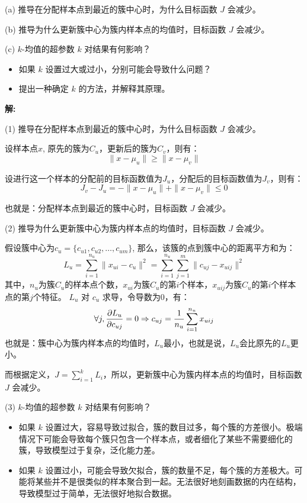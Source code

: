 \documentclass[8pt]{article}
\begin{document}
(a) 推导在分配样本点到最近的簇中心时，为什么目标函数 \( J \) 会减少。 

(b) 推导为什么更新簇中心为簇内样本点的均值时，目标函数 \( J \) 会减少。 

(c) \( k \)-均值的超参数 \( k \) 对结果有何影响？  
\begin{itemize}
    \item  如果 \( k \) 设置过大或过小，分别可能会导致什么问题？  
    \item 提出一种确定 \( k \) 的方法，并解释其原理。  
\end{itemize}

\textbf{\large 解:}

(1) 推导在分配样本点到最近的簇中心时，为什么目标函数 \( J \) 会减少。

设样本点$x$, 原先的簇为$C_u$，更新后的簇为$C_v$，则有：
\[\|x-\mu_u\| \ge \|x-\mu_v\|\]

设进行这一个样本的分配前的目标函数值为$J_u$，分配后的目标函数值为$J_v$，则有：
\[J_v - J_u = - \|x-\mu_u\| + \|x-\mu_v\| \le 0 \]

也就是：分配样本点到最近的簇中心时，目标函数 \( J \) 会减少。

(2) 推导为什么更新簇中心为簇内样本点的均值时，目标函数 \( J \) 会减少。

假设簇中心为$c_u = \{c_{u1}, c_{u2}, \dots , c_{um}\}$, 那么，该簇的点到簇中心的距离平方和为：
\[
    L_u = \sum_{i=1}^{n_u}{\|x_{ui} - c_u\|^2} = \sum_{i=1}^{n_u}\sum_{j=1}^{m} \|c_{uj} - x_{uij}\|^2
\]
其中，$n_u$为簇$C_u$的样本点个数，$x_{ui}$为簇$C_u$的第$i$个样本，$x_{uij}$为簇$C_u$的第$i$个样本点的第$j$个特征。
$L_u$ 对 $c_u$ 求导，令导数为0，有：
\[
    \forall j, \space \frac{\partial L_u}{\partial c_{uj}} = 0 \Rightarrow c_{uj} = \frac{1}{n_u}\sum_{i=1}^{n_u}x_{uij}
\] 
也就是：簇中心为簇内样本点的均值时，$L_u$最小，也就是说，$L_u$会比原先的$L_u$更小。

而根据定义，$J = \sum_{i=1}^{k} L_i$，所以，更新簇中心为簇内样本点的均值时，目标函数 \( J \) 会减少。

(3) \( k \)-均值的超参数 \( k \) 对结果有何影响？ 

\begin{itemize}
    \item 如果 \( k \) 设置过大，容易导致过拟合，簇的数目过多，每个簇的方差很小。极端情况下可能会导致每个簇只包含一个样本点，或者细化了某些不需要细化的簇，导致模型过于复杂，泛化能力差。
    \item 如果 \( k \) 设置过小，可能会导致欠拟合，簇的数量不足，每个簇的方差极大。可能将某些并不是很类似的样本聚合到一起。无法很好地刻画数据的内在结构，导致模型过于简单，无法很好地拟合数据。
\end{itemize}
\end{document}
